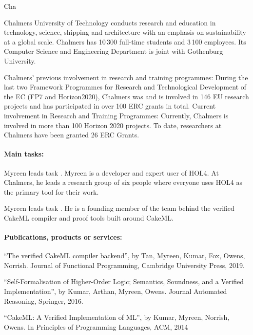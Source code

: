 \begin{sitedescription}{Cha}


Chalmers University of Technology conducts research and education in
technology, science, shipping and architecture with an emphasis on
sustainability at a global scale. Chalmers has 10\,300 full-time
students and 3\,100 employees.  Its Computer Science and Engineering
Department is joint with Gothenburg University.

Chalmers' previous involvement in research and training programmes:
During the last two Framework Programmes for Research and
Technological Development of the EC (FP7 and Horizon2020), Chalmers
was and is involved in 146 EU research projects and has participated
in over 100 ERC grants in total.  Current involvement in Research and
Training Programmes: Currently, Chalmers is involved in more than 100
Horizon 2020 projects.  To date, researchers at Chalmers have been
granted 26 ERC Grants.

\paragraph*{Main tasks:}

\begin{compactitem}
\item Myreen leads task .  Myreen is a
  developer and expert user of HOL4. At Chalmers, he leads
  a research group of six people where everyone uses HOL4 as the
  primary tool for their work.
\item Myreen leads task . He is a founding
  member of the team behind the verified CakeML compiler and proof
  tools built around CakeML.
\end{compactitem}

\paragraph*{Publications, products or services:}

\begin{compactitem}
\item
  ``The verified CakeML compiler backend'',
  by Tan, Myreen, Kumar, Fox, Owens, Norrish.
  Journal of Functional Programming, Cambridge University Press, 2019.
\item
  ``Self-Formalisation of Higher-Order Logic;
  Semantics, Soundness, and a Verified Implementation'',
  by Kumar, Arthan, Myreen, Owens.
  Journal Automated Reasoning, Springer, 2016.
\item
  ``CakeML: A Verified Implementation of ML'',
  by Kumar, Myreen, Norrish, Owens.
  In Principles of Programming Languages, ACM, 2014
\end{compactitem}


\end{sitedescription}

